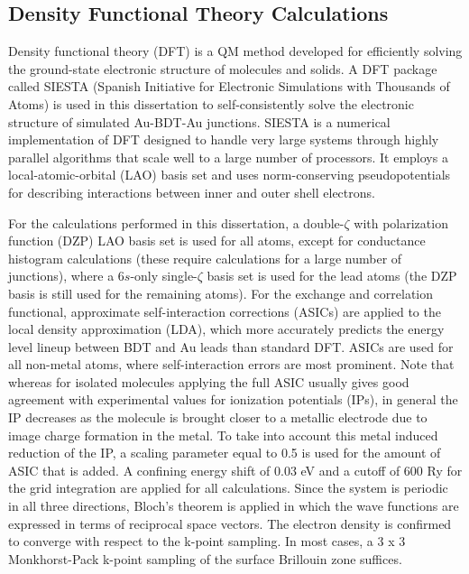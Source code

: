 \documentclass[10pt]{report}  %
\newcommand\findent{\hspace*{\parindent}}
\begin{document}
\subsection{Density Functional Theory Calculations}

\findent Density functional theory (DFT) is a QM method developed for efficiently solving the ground-state electronic structure of molecules and solids.\cite{Hohenberg:1964,Kohn:1965} A DFT package called SIESTA\cite{Ordejon:1996,Sanchez-Portal:1997} (Spanish Initiative for Electronic Simulations with Thousands of Atoms) is used in this dissertation to self-consistently solve the electronic structure of simulated Au-BDT-Au junctions. SIESTA is a numerical implementation of DFT designed to handle very large systems through highly parallel algorithms that scale well to a large number of processors. It employs a local-atomic-orbital (LAO) basis set and uses norm-conserving pseudopotentials for describing interactions between inner and outer shell electrons.

For the calculations performed in this dissertation, a double-$\zeta$ with polarization function (DZP) LAO basis set is used for all atoms, except for conductance histogram calculations (these require calculations for a large number of junctions), where a 6$s$-only single-$\zeta$ basis set is used for the lead atoms (the DZP basis is still used for the remaining atoms).\cite{Toher:2008}  For the exchange and correlation functional, approximate self-interaction corrections (ASICs) \cite{Pemmaraju:2007} are applied to the local density approximation (LDA), which more accurately predicts the energy level lineup between BDT and Au leads than standard DFT.\cite{Toher:2007,Toher:2008,Pontes:2011} ASICs are used for all non-metal atoms, where self-interaction errors are most prominent. Note that whereas for isolated molecules applying the full ASIC usually gives good agreement with experimental values for ionization potentials (IPs), in general the IP decreases as the molecule is brought closer to a metallic electrode due to image charge formation in the metal.\cite{Neaton:2006} To take into account this metal induced reduction of the IP, a scaling parameter equal to 0.5 is used for the amount of ASIC that is added. \cite{Pemmaraju:2007} A confining energy shift of 0.03 eV and a cutoff of 600 Ry for the grid integration are applied for all calculations. Since the system is periodic in all three directions, Bloch's theorem\cite{Ashcroft:1976} is applied in which the wave functions are expressed in terms of reciprocal space vectors. The electron density is confirmed to converge with respect to the k-point sampling. In most cases, a 3 x 3 Monkhorst-Pack k-point sampling of the surface Brillouin zone suffices.
\end{document}
